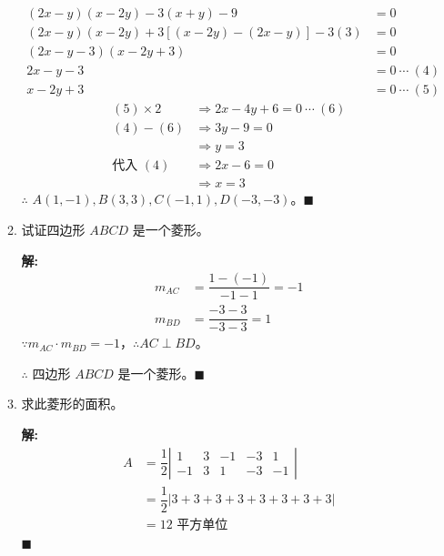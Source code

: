 \documentclass[10pt]{article}
\newcommand{\sol}{\textbf{解:} }
\begin{document}
\begin{enumerate}[leftmargin=*]
\begin{enumerate}
\begin{align*}
                  (2x - y)(x - 2y) - 3(x + y) - 9                  & = 0              \\
                  (2x - y)(x - 2y) + 3[(x - 2y) - (2x - y)] - 3(3) & = 0              \\
                  (2x - y - 3)(x - 2y + 3)                         & = 0              \\
                  2x - y - 3                                       & = 0\ \cdots\ (4) \\
                  x - 2y + 3                                       & = 0\ \cdots\ (5)
                \end{align*}
                \begin{align*}
                  (5) \times 2  & \Rightarrow 2x - 4y + 6 = 0\ \cdots\ (6) \\
                  (4) - (6)     & \Rightarrow 3y - 9 = 0                   \\
                                & \Rightarrow y = 3                        \\
                  \text{代入 }(4) & \Rightarrow 2x - 6 = 0                   \\
                                & \Rightarrow x = 3
                \end{align*}
                $\therefore$ $A(1, -1), B(3, 3), C(-1, 1), D(-3, -3)$。\hfill$\blacksquare$

          \item 试证四边形 $ABCD$ 是一个菱形。

                \sol{}
                \begin{align*}
                  m_{AC} & = \dfrac{1 - (-1)}{-1 - 1} = -1 \\
                  m_{BD} & = \dfrac{-3 - 3}{-3 - 3} = 1
                \end{align*}
                $\because m_{AC} \cdot m_{BD} = -1$，$\therefore AC \perp BD$。

                $\therefore$ 四边形 $ABCD$ 是一个菱形。\hfill$\blacksquare$

          \item 求此菱形的面积。

                \sol{}
                \begin{align*}
                  A & = \dfrac{1}{2} \left\vert\begin{matrix}
                                                 1  & 3 & -1 & -3 & 1  \\
                                                 -1 & 3 & 1  & -3 & -1
                                               \end{matrix}\right\vert           \\
                    & = \dfrac{1}{2} \left\vert3 + 3 + 3 + 3+ 3+3+3+3\right\vert \\
                    & = 12 \text{ 平方单位}
                \end{align*} \hfill$\blacksquare$
        \end{enumerate}


\end{enumerate}
\end{document}
